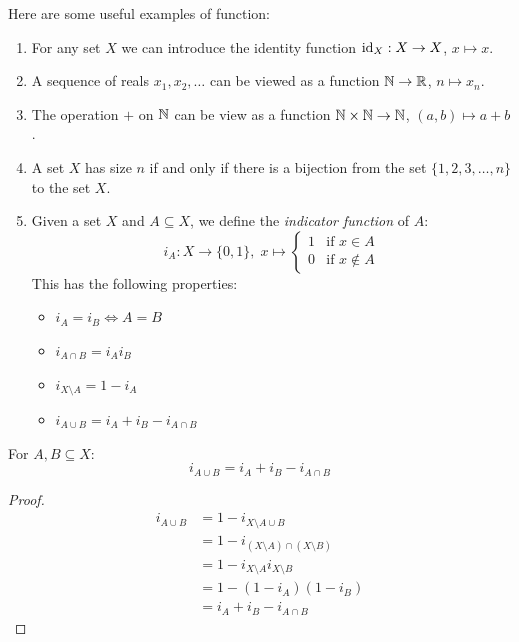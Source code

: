 \documentclass[../main.tex]{subfiles}
\begin{document}
\begin{example}
  Here are some useful examples of function:
  \begin{enumerate}
    \item For any set $X$ we can introduce the identity function $\mathrm{id}_X: X \to X$, $x \mapsto x$.
    \item A sequence of reals $x_1, x_2, \ldots$ can be viewed as a function $\mathbb{N} \to \mathbb{R}$, $n \mapsto x_n$.
    \item The operation $+$ on $\mathbb{N}$ can be view as a function $\mathbb{N} \times \mathbb{N} \to \mathbb{N}$, $(a, b) \mapsto a + b$.
    \item A set $X$ has size $n$ if and only if there is a bijection from the set $\{1, 2, 3, \ldots, n\}$ to the set $X$.
    \item Given a set $X$ and $A \subseteq X$, we define the \textit{indicator function} of $A$:
      \[
        i_A: X \to \{0, 1\},\;
        x \mapsto \begin{cases}
          1 & \text{if } x\in A \\
          0 & \text{if } x\notin A
        \end{cases}
      \]
    This has the following properties:
    \begin{itemize}
      \item $i_A = i_B \iff A = B$
      \item $i_{A \cap B} = i_A i_B$
      \item $i_{X \setminus A} = 1 - i_A$
      \item $i_{A \cup B} = i_A + i_B - i_{A \cap B}$
    \end{itemize}
  \end{enumerate}
\end{example}
\begin{proposition}
  For $A, B \subseteq X$:
  \[
    i_{A \cup B} = i_A + i_B - i_{A \cap B}
  \]
\end{proposition}
\begin{proof}
  \begin{align*}
    i_{A \cup B} &= 1 - i_{X \setminus A \cup B} \\
                 &= 1 - i_{(X \setminus A) \cap (X \setminus B)} \\
                 &= 1 - i_{X \setminus A} i_{X \setminus B} \\
                 &= 1 - (1 - i_A)(1 - i_B) \\
                 &= i_A + i_B - i_{A \cap B}
  \end{align*}
\end{proof}
\end{document}
